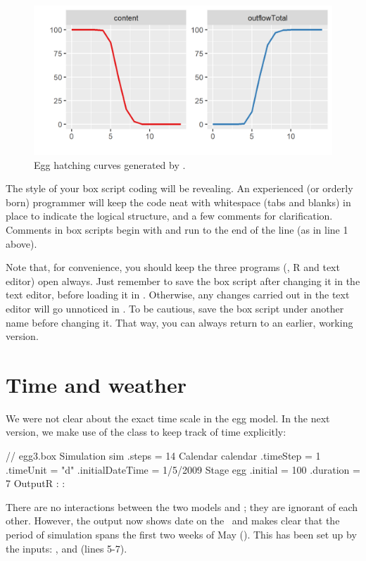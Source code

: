 \begin{figure}
\centering
\includegraphics{graphics/egg2}
\caption{Egg hatching curves generated by .}
\label{fig:egg2}
\end{figure}

The style of your box script coding will be revealing. An experienced (or orderly born) programmer will keep the code neat with whitespace (tabs and blanks) in place to indicate the logical structure, and a few comments for clarification. Comments in box scripts begin with \code{//} and run to the end of the line (as in line 1 above).

Note that, for convenience, you should keep the three programs (\US, R and text editor) open always. Just remember to save the box script after changing it in the text editor, before loading it in \US. Otherwise, any changes carried out in the text editor will go unnoticed in \US. To be cautious, save the box script under another name before changing it. That way, you can always return to an earlier, working version.

\section{Time and weather}
We were not clear about the exact time scale in the egg model. In the next version, we make use of the  class to keep track of time explicitly:

\lstset{numbers=left}
\begin{boxscript}
// egg3.box
Simulation sim {
  .steps = 14
  Calendar calendar {
    .timeStep = 1
    .timeUnit = "d"
    .initialDateTime = 1/5/2009
  }
  Stage egg {
    .initial = 100 
    .duration = 7
  }
  OutputR {
:
:
  }
}
\end{boxscript}
\lstset{numbers=none}

There are no interactions between the two models  and ; they are ignorant of each other. However, the output now shows date on the \xaxis\ and makes clear that the period of simulation spans the first two weeks of May (). This has been set up by the  inputs: ,  and  (lines 5-7). 

